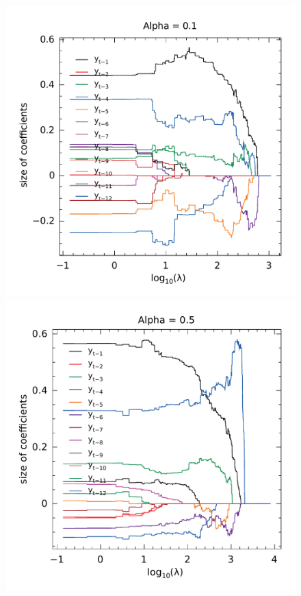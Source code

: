 \begin{figure}
\begin{minipage}[t]{0.4\linewidth}
\begin{minipage}[b]{\linewidth}
			\centering     \includegraphics[width=\textwidth]{Figuras/selecao-lasso/par-sellasso-01.pdf}
		\end{minipage}
		\begin{minipage}[b]{\linewidth}
			\centering     \includegraphics[width=\textwidth]{Figuras/selecao-lasso/par-sellasso-05.pdf}

\end{minipage}
\end{minipage}
\end{figure}
